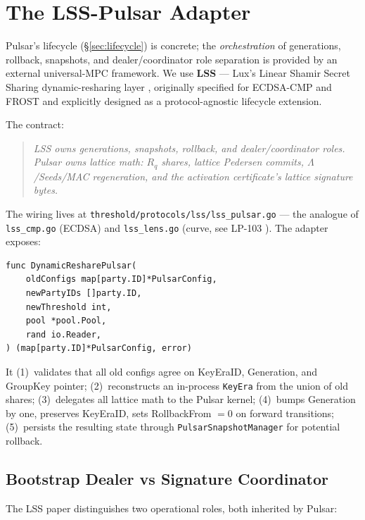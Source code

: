 \section{The LSS-Pulsar Adapter}
\label{sec:lss-pulsar}

Pulsar's lifecycle (\S\ref{sec:lifecycle}) is concrete; the
\emph{orchestration} of generations, rollback, snapshots, and
dealer/coordinator role separation is provided by an external
universal-MPC framework. We use \textbf{LSS} \cite{luxlssmpc} ---
Lux's Linear Shamir Secret Sharing dynamic-resharing layer
\cite{lp077}, originally specified for ECDSA-CMP and FROST and
explicitly designed as a protocol-agnostic lifecycle extension.

The contract:
\begin{quote}\itshape
LSS owns generations, snapshots, rollback, and dealer/coordinator
roles. Pulsar owns lattice math: $R_q$ shares, lattice Pedersen
commits, $\Lambda$/Seeds/MAC regeneration, and the activation
certificate's lattice signature bytes.
\end{quote}

The wiring lives at \texttt{threshold/protocols/lss/lss\_pulsar.go} ---
the analogue of \texttt{lss\_cmp.go} (ECDSA) and \texttt{lss\_lens.go}
(curve, see LP-103 \cite{lp103}). The adapter exposes:

\begin{verbatim}
func DynamicResharePulsar(
    oldConfigs map[party.ID]*PulsarConfig,
    newPartyIDs []party.ID,
    newThreshold int,
    pool *pool.Pool,
    rand io.Reader,
) (map[party.ID]*PulsarConfig, error)
\end{verbatim}

It (1)~validates that all old configs agree on KeyEraID, Generation, and
GroupKey pointer; (2)~reconstructs an in-process \texttt{KeyEra} from
the union of old shares; (3)~delegates all lattice math to the Pulsar
kernel; (4)~bumps Generation by one, preserves KeyEraID, sets
RollbackFrom $= 0$ on forward transitions; (5)~persists the resulting
state through \texttt{PulsarSnapshotManager} for potential rollback.

\subsection{Bootstrap Dealer vs Signature Coordinator}

The LSS paper distinguishes two operational roles, both inherited by
Pulsar:

